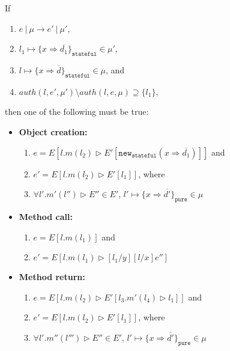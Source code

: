 \documentclass{llncs}
\newcommand{\keywadj}[1]{\mathtt{#1}}
\begin{document}
\begin{theorem} If
\begin{enumerate}
\item $e~|~\mu \longrightarrow e'~|~\mu'$,
\item $l_1 \mapsto \{ x \Rightarrow \overline{d_1} \}_{\keywadj{stateful}} \in \mu'$,
\item $l \mapsto \{ x \Rightarrow \overline{d} \}_{\keywadj{stateful}} \in \mu$, and
\item $auth(l, e', \mu') \setminus auth(l, e, \mu) \supseteq \{ l_1 \}$,
\end{enumerate}
then one of the following must be true:
\begin{itemize}
\item \textbf{Object creation:}
\begin{enumerate}
\item $e = E[l.m(l_2) \rhd E'[\keywadj{new}_{\keywadj{stateful}}(x \Rightarrow \overline{d_1})]]$ and
\item $e' = E[l.m(l_2) \rhd E'[l_1]]$, where
\item $\forall l'.m'(l'') \rhd E'' \in E'$, $l' \mapsto \{ x \Rightarrow \overline{d'}\}_{\keywadj{pure}} \in \mu$
\end{enumerate}

\item \textbf{Method call:}
\begin{enumerate}
\item $e = E[l.m(l_1)]$ and
\item $e' = E[l.m(l_1) \rhd [l_1/y][l/x]e'']$
\end{enumerate}

\item \textbf{Method return:}
\begin{enumerate}
\item $e = E[l.m(l_2) \rhd E'[l_3.m'(l_4) \rhd l_1]]$ and
\item $e' = E[l.m(l_2) \rhd E'[l_1]]$, where
\item $\forall l'.m''(l''') \rhd E'' \in E'$, $l' \mapsto \{ x \Rightarrow \overline{d'}\}_{\keywadj{pure}} \in \mu$
\end{enumerate}
\end{itemize}

\end{theorem}
\end{document}
